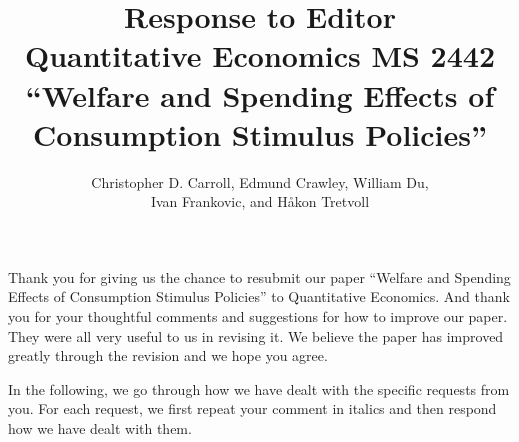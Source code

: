 \documentclass[12pt,letterpaper,english]{article}
\title{\textbf{Response to Editor\\ Quantitative Economics MS 2442 \\``Welfare and Spending Effects of \\ Consumption Stimulus Policies''}}
\author{Christopher D. Carroll, Edmund Crawley, William Du, \\ Ivan Frankovic, and H\aa kon Tretvoll}
\date{}
\begin{document}
	\onehalfspacing
	\maketitle
	
	\noindent Thank you for giving us the chance to resubmit our paper ``Welfare and Spending Effects of Consumption Stimulus Policies'' to Quantitative Economics. And thank you for your thoughtful comments and suggestions for how to improve our paper. They were all very useful to us in revising it. We believe the paper has improved greatly through the revision and we hope you agree. 
	
	In the following, we go through how we have dealt with the specific requests from you. For each request, we first repeat your comment in italics and then respond how we have dealt with them.
	
\end{document}
